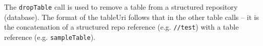 The \verb+dropTable+ call is used to remove a table from a structured repository (database). The
format of the tableUri follows that in the other table calls -- it is the concatenation of a structured
repo reference (e.g. \verb+//test+) with a table reference (e.g. \verb+sampleTable+).
